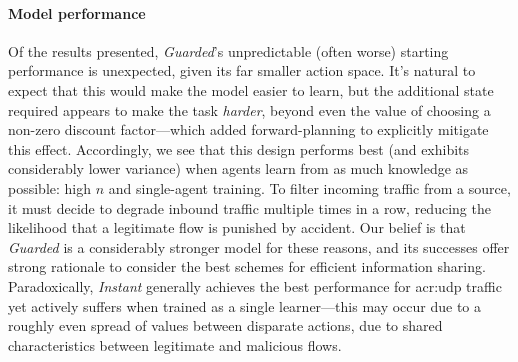

\paragraph{Model performance}
Of the results presented, \emph{Guarded}'s unpredictable (often worse) starting performance is unexpected, given its far smaller action space.
It's natural to expect that this would make the model easier to learn, but the additional state required appears to make the task \emph{harder}, beyond even the value of choosing a non-zero discount factor---which added forward-planning to explicitly mitigate this effect.
Accordingly, we see that this design performs best (and exhibits considerably lower variance) when agents learn from as much knowledge as possible: high $n$ and single-agent training.
To filter incoming traffic from a source, it must decide to degrade inbound traffic multiple times in a row, reducing the likelihood that a legitimate flow is punished by accident.
Our belief is that \emph{Guarded} is a considerably stronger model for these reasons, and its successes offer strong rationale to consider the best schemes for efficient information sharing.
Paradoxically, \emph{Instant} generally achieves the best performance for \gls{acr:udp} traffic yet actively suffers when trained as a single learner---this may occur due to a roughly even spread of values between disparate actions, due to shared characteristics between legitimate and malicious flows.

